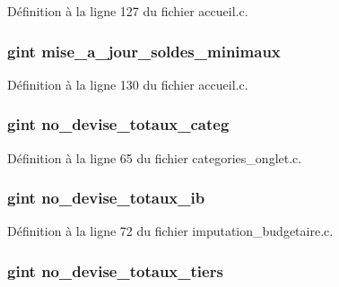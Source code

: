 Définition à la ligne 127 du fichier accueil.c.

\subsubsection[{mise\_\-a\_\-jour\_\-soldes\_\-minimaux}]{\setlength{\rightskip}{0pt plus 5cm}gint {\bf mise\_\-a\_\-jour\_\-soldes\_\-minimaux}}\label{import_8c_afaffaedc4fd0ae8638f7158c6777b35b}


Définition à la ligne 130 du fichier accueil.c.

\subsubsection[{no\_\-devise\_\-totaux\_\-categ}]{\setlength{\rightskip}{0pt plus 5cm}gint {\bf no\_\-devise\_\-totaux\_\-categ}}\label{import_8c_a8f609654dcfbbcaa6791bcee83d6473d}


Définition à la ligne 65 du fichier categories\_\-onglet.c.

\subsubsection[{no\_\-devise\_\-totaux\_\-ib}]{\setlength{\rightskip}{0pt plus 5cm}gint {\bf no\_\-devise\_\-totaux\_\-ib}}\label{import_8c_a2f4b5073521c582e1bc8941533026556}


Définition à la ligne 72 du fichier imputation\_\-budgetaire.c.

\subsubsection[{no\_\-devise\_\-totaux\_\-tiers}]{\setlength{\rightskip}{0pt plus 5cm}gint {\bf no\_\-devise\_\-totaux\_\-tiers}}\label{import_8c_a3add720d0e0b25caa37589bcfb879c6f}


